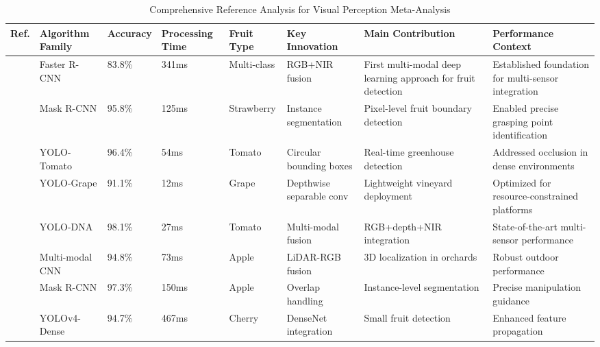 \documentclass[a4paper,fleqn]{cas-dc}
\begin{document}
\begin{table}[htbp]
\centering
\footnotesize
\caption{Comprehensive Reference Analysis for Visual Perception Meta-Analysis}
\label{tab:visual_perception_refs}
\begin{tabular}{p{}p{}p{}p{}p{}p{}p{}p{}}
\toprule
\textbf{Ref.} & \textbf{Algorithm Family} & \textbf{Accuracy} & \textbf{Processing Time} & \textbf{Fruit Type} & \textbf{Key Innovation} & \textbf{Main Contribution} & \textbf{Performance Context} \\ \midrule

\cite{sa2016deepfruits} & Faster R-CNN & 83.8\% & 341ms & Multi-class & RGB+NIR fusion & First multi-modal deep learning approach for fruit detection & Established foundation for multi-sensor integration \\

\cite{yu2019fruit} & Mask R-CNN & 95.8\% & 125ms & Strawberry & Instance segmentation & Pixel-level fruit boundary detection & Enabled precise grasping point identification \\

\cite{liu2020yolo} & YOLO-Tomato & 96.4\% & 54ms & Tomato & Circular bounding boxes & Real-time greenhouse detection & Addressed occlusion in dense environments \\

\cite{li2021real} & YOLO-Grape & 91.1\% & 12ms & Grape & Depthwise separable conv & Lightweight vineyard deployment & Optimized for resource-constrained platforms \\

\cite{chen2024mlp} & YOLO-DNA & 98.1\% & 27ms & Tomato & Multi-modal fusion & RGB+depth+NIR integration & State-of-the-art multi-sensor performance \\

\cite{gene2019fruit} & Multi-modal CNN & 94.8\% & 73ms & Apple & LiDAR-RGB fusion & 3D localization in orchards & Robust outdoor performance \\

\cite{jia2020detection} & Mask R-CNN & 97.3\% & 150ms & Apple & Overlap handling & Instance-level segmentation & Precise manipulation guidance \\

\cite{gai2023detection} & YOLOv4-Dense & 94.7\% & 467ms & Cherry & DenseNet integration & Small fruit detection & Enhanced feature propagation \\


\end{tabular}
\end{table}
\end{document}
